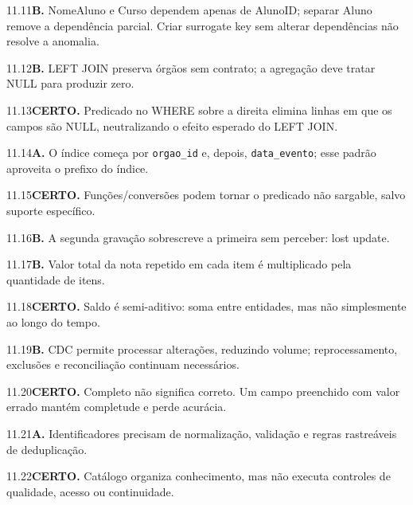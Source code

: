 \begin{solucao}{11.11}\textbf{B.} NomeAluno e Curso dependem apenas de AlunoID; separar Aluno remove a dependência parcial. Criar surrogate key sem alterar dependências não resolve a anomalia.\end{solucao}
\begin{solucao}{11.12}\textbf{B.} LEFT JOIN preserva órgãos sem contrato; a agregação deve tratar NULL para produzir zero.\end{solucao}
\begin{solucao}{11.13}\textbf{CERTO.} Predicado no WHERE sobre a direita elimina linhas em que os campos são NULL, neutralizando o efeito esperado do LEFT JOIN.\end{solucao}
\begin{solucao}{11.14}\textbf{A.} O índice começa por \texttt{orgao\_id} e, depois, \texttt{data\_evento}; esse padrão aproveita o prefixo do índice.\end{solucao}
\begin{solucao}{11.15}\textbf{CERTO.} Funções/conversões podem tornar o predicado não sargable, salvo suporte específico.\end{solucao}
\begin{solucao}{11.16}\textbf{B.} A segunda gravação sobrescreve a primeira sem perceber: lost update.\end{solucao}
\begin{solucao}{11.17}\textbf{B.} Valor total da nota repetido em cada item é multiplicado pela quantidade de itens.\end{solucao}
\begin{solucao}{11.18}\textbf{CERTO.} Saldo é semi-aditivo: soma entre entidades, mas não simplesmente ao longo do tempo.\end{solucao}
\begin{solucao}{11.19}\textbf{B.} CDC permite processar alterações, reduzindo volume; reprocessamento, exclusões e reconciliação continuam necessários.\end{solucao}
\begin{solucao}{11.20}\textbf{CERTO.} Completo não significa correto. Um campo preenchido com valor errado mantém completude e perde acurácia.\end{solucao}
\begin{solucao}{11.21}\textbf{A.} Identificadores precisam de normalização, validação e regras rastreáveis de deduplicação.\end{solucao}
\begin{solucao}{11.22}\textbf{CERTO.} Catálogo organiza conhecimento, mas não executa controles de qualidade, acesso ou continuidade.\end{solucao}
